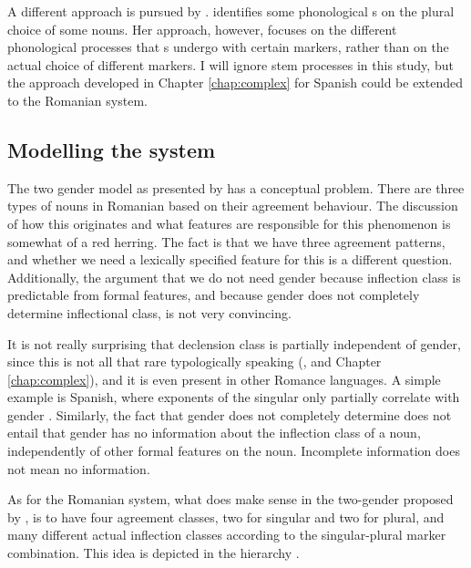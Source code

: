 A different approach is pursued by \textcite{Steriade.2008}. \citeauthor{Steriade.2008} identifies some phonological s on the plural choice of some nouns. Her approach, however, focuses on the different phonological processes that s undergo with certain markers, rather than on the actual choice of different markers. I will ignore stem processes in this study, but the approach developed in Chapter \ref{chap:complex} for Spanish could be extended to the Romanian system.


\subsection{Modelling the system}

The two gender model as presented by \textcite{Bateman.2010} has a conceptual problem. There are three types of nouns in Romanian based on their agreement behaviour. The discussion of how this originates and what features are responsible for this phenomenon is somewhat of a red herring. The fact is that we have three agreement patterns, and whether we need a lexically specified feature for this is a different question. Additionally, the argument that we do not need gender because inflection class is predictable from formal features, and because gender does not completely determine inflectional class, is not very convincing.

It is not really surprising that declension class is partially independent of gender, since this is not all that rare typologically speaking (\cite{Corbett.1991}, and Chapter \ref{chap:complex}), and it is even present in other Romance languages. A simple example is Spanish, where exponents of the singular only partially correlate with gender \autocite{Harris.1991}. Similarly, the fact that gender does not completely determine  does not entail that gender has no information about the inflection class of a noun, independently of other formal features on the noun. Incomplete information does not mean no information.

As for the Romanian system, what does make sense in the two-gender proposed by \textcite{Bateman.2010}, is to have four agreement classes, two for singular and two for plural, and many different actual inflection classes according to the singular-plural marker combination. This idea is depicted in the hierarchy .

